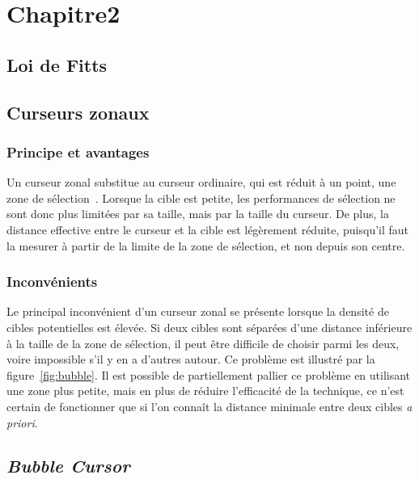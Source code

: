 
\chapter[Chapitre2]{Chapitre2}
\minitoc
\label{chap2}
\cleardoublepage

\section{Loi de Fitts}

\section{Curseurs zonaux}
	\subsection{Principe et avantages}
	Un curseur zonal substitue au curseur ordinaire, qui est réduit à un point, une zone de sélection~\cite{worden1997making, kabbash1995prince}. Lorsque la cible est petite, les performances de sélection ne sont donc plus limitées par sa taille, mais par la taille du curseur. De plus, la distance effective entre le curseur et la cible est légèrement réduite, puisqu'il faut la mesurer à partir de la limite de la zone de sélection, et non depuis son centre.
	
	\subsection{Inconvénients}
	Le principal inconvénient d'un curseur zonal se présente lorsque la densité de cibles potentielles est élevée. Si deux cibles sont séparées d'une distance inférieure à la taille de la zone de sélection, il peut être difficile de choisir parmi les deux, voire impossible s'il y en a d'autres autour. Ce problème est illustré par la figure~\ref{fig:bubble}. Il est possible de partiellement pallier ce problème en utilisant une zone plus petite, mais en plus de réduire l'efficacité de la technique, ce n'est certain de fonctionner que si l'on connaît la distance minimale entre deux cibles \emph{a priori}.

\section{\emph{Bubble Cursor}}
